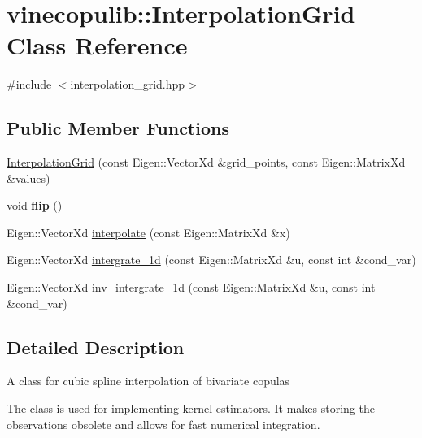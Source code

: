 \hypertarget{classvinecopulib_1_1_interpolation_grid}{}\section{vinecopulib\+:\+:Interpolation\+Grid Class Reference}
\label{classvinecopulib_1_1_interpolation_grid}


{\ttfamily \#include $<$interpolation\+\_\+grid.\+hpp$>$}

\subsection*{Public Member Functions}
\begin{DoxyCompactItemize}
\item 
\hyperlink{classvinecopulib_1_1_interpolation_grid_a9e63e4af3a252454eeae6df38fd8e0ca}{Interpolation\+Grid} (const Eigen\+::\+Vector\+Xd \&grid\+\_\+points, const Eigen\+::\+Matrix\+Xd \&values)
\item 
void {\bfseries flip} ()\hypertarget{classvinecopulib_1_1_interpolation_grid_a8dc18717a2e8dfe5b157571805a25dab}{}\label{classvinecopulib_1_1_interpolation_grid_a8dc18717a2e8dfe5b157571805a25dab}

\item 
Eigen\+::\+Vector\+Xd \hyperlink{classvinecopulib_1_1_interpolation_grid_a7fe207d7f864d2b05654c5efb5e27f35}{interpolate} (const Eigen\+::\+Matrix\+Xd \&x)
\item 
Eigen\+::\+Vector\+Xd \hyperlink{classvinecopulib_1_1_interpolation_grid_aa1811201ba71d8c3375b8e42df6f673a}{intergrate\+\_\+1d} (const Eigen\+::\+Matrix\+Xd \&u, const int \&cond\+\_\+var)
\item 
Eigen\+::\+Vector\+Xd \hyperlink{classvinecopulib_1_1_interpolation_grid_a087c7e9b9c6087b6cbbb8ba7b7292582}{inv\+\_\+intergrate\+\_\+1d} (const Eigen\+::\+Matrix\+Xd \&u, const int \&cond\+\_\+var)
\end{DoxyCompactItemize}


\subsection{Detailed Description}
A class for cubic spline interpolation of bivariate copulas

The class is used for implementing kernel estimators. It makes storing the observations obsolete and allows for fast numerical integration. 

